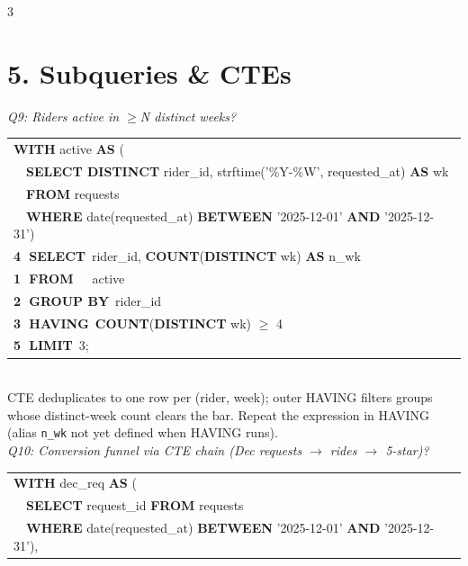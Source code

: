 \documentclass[landscape,letterpaper,9pt]{extarticle}
\begin{document}
\begin{multicols*}{3}
\section*{5. Subqueries \& CTEs}
\textit{\scriptsize Q9: Riders active in $\geq$N distinct weeks?}\\[1pt]
\colorbox{black!4}{%
\begin{minipage}{\dimexpr\linewidth-2pt}
{\ttfamily\scriptsize
\begin{tabular}{@{}l@{}}
\textbf{WITH} active \textbf{AS} ( \\
~~\textbf{SELECT DISTINCT} rider\_id, strftime('\%Y-\%W', requested\_at) \textbf{AS} wk \\
~~\textbf{FROM} requests \\
~~\textbf{WHERE} date(requested\_at) \textbf{BETWEEN} '2025-12-01' \textbf{AND} '2025-12-31') \\
\textcolor{stepHaving}{\textbf{\textcircled{\scriptsize 4} SELECT}~rider\_id, \textbf{COUNT}(\textbf{DISTINCT} wk) \textbf{AS} n\_wk} \\
\textcolor{stepFrom}{\textbf{\textcircled{\scriptsize 1} FROM}~~~active} \\
\textcolor{stepWhere}{\textbf{\textcircled{\scriptsize 2} GROUP BY}~rider\_id} \\
\textcolor{stepGroup}{\textbf{\textcircled{\scriptsize 3} HAVING}~\textbf{COUNT}(\textbf{DISTINCT} wk) $\geq$ 4} \\
\textcolor{stepSelect}{\textbf{\textcircled{\scriptsize 5} LIMIT}~3;} \\
\end{tabular}}
\end{minipage}}
\\[1pt]
\textcolor{cmt}{\scriptsize CTE deduplicates to one row per (rider, week); outer HAVING filters groups whose distinct-week count clears the bar. Repeat the expression in HAVING (alias \texttt{n\_wk} not yet defined when HAVING runs).}\\[3pt]
\textit{\scriptsize Q10: Conversion funnel via CTE chain (Dec requests $\to$ rides $\to$ 5-star)?}\\[1pt]
\colorbox{black!4}{%
\begin{minipage}{\dimexpr\linewidth-2pt}
{\ttfamily\scriptsize
\begin{tabular}{@{}l@{}}
\textbf{WITH} dec\_req \textbf{AS} ( \\
~~\textbf{SELECT} request\_id \textbf{FROM} requests \\
~~\textbf{WHERE} date(requested\_at) \textbf{BETWEEN} '2025-12-01' \textbf{AND} '2025-12-31'), \\

\end{tabular}}
\end{minipage}}
\end{multicols*}
\end{document}
